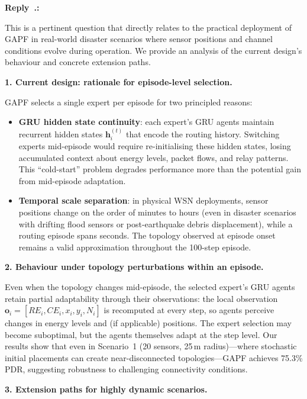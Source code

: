 \documentclass[11pt]{article}
\newcounter{reviewer}
\newcounter{replyctr}[reviewer]
\renewcommand{\thereplyctr}{\thereviewer.\arabic{replyctr}}
\newenvironment{reply}
  {\refstepcounter{replyctr}%
   \addtocounter{replyctr}{-1}%
   \medskip\noindent
   \begin{sf}\textbf{Reply~\thereplyctr:}\ }
  {\addtocounter{replyctr}{1}%
   \medskip\end{sf}}
\begin{document}
\begin{reply}
\begin{mdframed}[style=Resp]
This is a pertinent question that directly relates to the practical deployment of GAPF in real-world disaster scenarios where sensor positions and channel conditions evolve during operation. We provide an analysis of the current design's behaviour and concrete extension paths.

\medskip
\noindent\textbf{1. Current design: rationale for episode-level selection.}

GAPF selects a single expert per episode for two principled reasons:

\begin{itemize}[nosep]
    \item \textbf{GRU hidden state continuity}: each expert's GRU agents maintain recurrent hidden states $\mathbf{h}_i^{(t)}$ that encode the routing history. Switching experts mid-episode would require re-initialising these hidden states, losing accumulated context about energy levels, packet flows, and relay patterns. This ``cold-start'' problem degrades performance more than the potential gain from mid-episode adaptation.
    
    \item \textbf{Temporal scale separation}: in physical WSN deployments, sensor positions change on the order of minutes to hours (even in disaster scenarios with drifting flood sensors or post-earthquake debris displacement), while a routing episode spans seconds. The topology observed at episode onset remains a valid approximation throughout the 100-step episode.
\end{itemize}

\medskip
\noindent\textbf{2. Behaviour under topology perturbations within an episode.}

Even when the topology changes mid-episode, the selected expert's GRU agents retain partial adaptability through their observations: the local observation $\mathbf{o}_i = [RE_i, CE_i, x_i, y_i, N_i]$ is recomputed at every step, so agents perceive changes in energy levels and (if applicable) positions. The expert selection may become suboptimal, but the agents themselves adapt at the step level. Our results show that even in Scenario~1 (20 sensors, 25\,m radius)---where stochastic initial placements can create near-disconnected topologies---GAPF achieves 75.3\% PDR, suggesting robustness to challenging connectivity conditions.

\medskip
\noindent\textbf{3. Extension paths for highly dynamic scenarios.}


\end{mdframed}
\end{reply}
\end{document}

